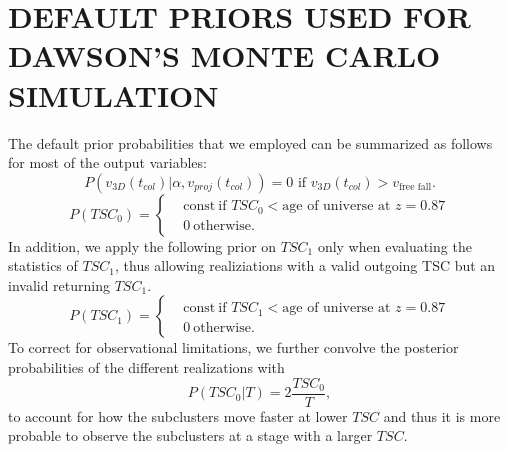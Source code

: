 \section{DEFAULT PRIORS USED FOR DAWSON'S MONTE CARLO SIMULATION}
\label{app:priors}
The default prior probabilities that we employed can be summarized as
follows for most of the output variables: 
\begin{equation}
	P(v_{3D}(t_{col}) | \alpha, v_{proj}(t_{col})) = 0\text{ if }v_{3D}(t_{col}) >
	v_{\text{free fall}}. 
\end{equation}
\begin{equation}
	P(TSC_0) = 
	\begin{cases}
		& \text{const}~\text{if }TSC_0 < \text{age of universe at } z=0.87	\\
		& 0~\text{otherwise}.
	\end{cases}
\end{equation}
In addition, we apply the following prior on $TSC_1$ only when evaluating the
statistics of $TSC_1$, thus allowing realiziations with a valid
outgoing TSC but an invalid returning $TSC_1$. 
\begin{equation}
	P(TSC_1) = 
	\begin{cases}
		& \text{const}~\text{if }TSC_1 < \text{age of universe at } z=0.87	\\
		& 0~\text{otherwise} \label{eqn:TSM_1}.
	\end{cases}
\end{equation}
To correct for observational limitations, we further convolve the
posterior probabilities of the different realizations with 
\begin{equation}
	P(TSC_0 | T) = 2 \frac{TSC_0}{T},
\end{equation}
to account for how the subclusters move faster at lower $TSC$ and thus it
is more probable to observe the subclusters at a stage with a larger $TSC$.
\par 
